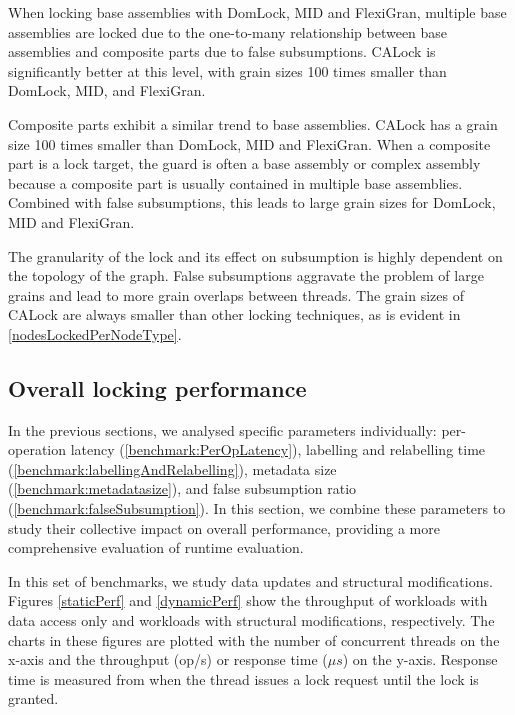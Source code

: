 When locking base assemblies with DomLock, MID and FlexiGran, multiple base assemblies are locked due to the one-to-many relationship between base assemblies and composite parts due to false subsumptions. CALock is significantly better at this level, with grain sizes 100 times smaller than DomLock, MID, and FlexiGran.

Composite parts exhibit a similar trend to base assemblies. CALock has a grain size 100 times smaller than DomLock, MID and FlexiGran. When a composite part is a lock target, the guard is often a base assembly or complex assembly because a composite part is usually contained in multiple base assemblies. Combined with false subsumptions, this leads to large grain sizes for DomLock, MID and FlexiGran.

The granularity of the lock and its effect on subsumption is highly dependent on the topology of the graph. 
False subsumptions aggravate the problem of large grains and lead to more grain overlaps between threads. 
The grain sizes of CALock are always smaller than other locking techniques, as is evident in \cref{nodesLockedPerNodeType}.


\subsection{Overall locking performance}

In the previous sections, we analysed specific parameters individually: per-operation latency (\cref{benchmark:PerOpLatency}), labelling and relabelling time (\cref{benchmark:labellingAndRelabelling}), metadata size (\cref{benchmark:metadatasize}), and false subsumption ratio (\cref{benchmark:falseSubsumption}). In this section, we combine these parameters to study their collective impact on overall performance, providing a more comprehensive evaluation of runtime evaluation. 

In this set of benchmarks, we study data updates and structural modifications. 
Figures \cref{staticPerf} and \cref{dynamicPerf} show the throughput of workloads with data access only and workloads with structural modifications, respectively. 
The charts in these figures are plotted with the number of concurrent threads on the x-axis and the throughput (op/s) or response time ($\mu s$) on the y-axis. 
Response time is measured from when the thread issues a lock request until the lock is granted.


